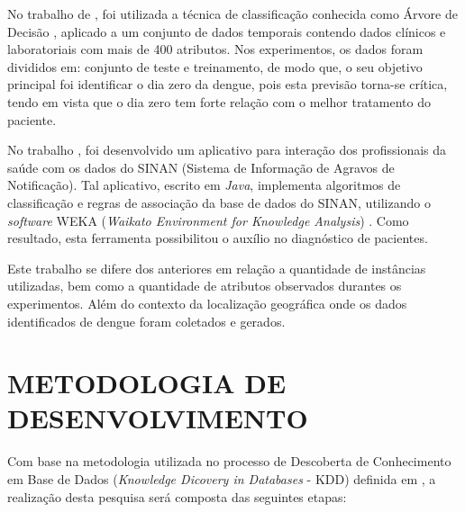 \documentclass[
	12pt,				%
	openright,			%
	oneside,	
	a4paper,				%
	english,				%
	brazil				%
]{abntex2/abntex2} %
\begin{document}
	No trabalho de \cite{thitiprayoonwongse:2012}, foi utilizada a técnica de classificação conhecida como Árvore de Decisão \cite{tan:2009}, aplicado a um conjunto de dados temporais contendo dados clínicos e laboratoriais com mais de 400 atributos. Nos experimentos, os dados foram divididos em: conjunto de teste e treinamento, de modo que, o seu objetivo principal foi identificar o dia zero da dengue, pois esta previsão torna-se crítica, tendo em vista que o dia zero tem forte relação com o melhor tratamento do paciente.
	
	No trabalho \cite{santos:2011}, foi desenvolvido um aplicativo para interação dos profissionais da saúde com os dados do SINAN (Sistema de Informação de Agravos de Notificação). Tal aplicativo, escrito em  \textit{Java}\cite{oracle:2015}, implementa algoritmos de classificação e regras de associação da base de dados do SINAN, utilizando o \textit{software} WEKA (\textit{Waikato Environment for Knowledge Analysis}) \cite{weka:2015}. Como resultado, esta ferramenta possibilitou o auxílio no diagnóstico de pacientes.
	
	Este trabalho se difere dos anteriores em relação a quantidade de instâncias utilizadas, bem como a quantidade de atributos observados durantes os experimentos. Além do contexto da localização geográfica onde os dados identificados de dengue foram coletados e gerados.
	\vspace{-1.5\baselineskip}
	\section{METODOLOGIA DE DESENVOLVIMENTO}
	\vspace{1\baselineskip}	
		Com base na metodologia utilizada no processo de Descoberta de Conhecimento em Base de Dados (\textit{Knowledge Dicovery in Databases} - KDD) definida em \cite{fayyad:1996}, a realização desta pesquisa será composta das seguintes etapas:
		
\end{document}
